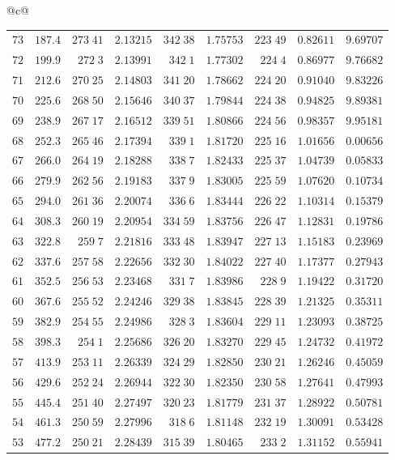 \begin{center}
{\begin{tabular}{@{}c@{}}
\begin{tabular}{r|r|r|r|r|r|r|r|r}
$73$&$187.4$&$273\;41$&$2.13215$&$342\;38$&$1.75753$&$223\;49$&$0.82611$&$9.69707$\\
$72$&$199.9$&$272\;3$&$2.13991$&$342\;1$&$1.77302$&$224\;4$&$0.86977$&$9.76682$\\
$71$&$212.6$&$270\;25$&$2.14803$&$341\;20$&$1.78662$&$224\;20$&$0.91040$&$9.83226$\\[2pt]
$70$&$225.6$&$268\;50$&$2.15646$&$340\;37$&$1.79844$&$224\;38$&$0.94825$&$9.89381$\\
$69$&$238.9$&$267\;17$&$2.16512$&$339\;51$&$1.80866$&$224\;56$&$0.98357$&$9.95181$\\
$68$&$252.3$&$265\;46$&$2.17394$&$339\;1$&$1.81720$&$225\;16$&$1.01656$&$0.00656$\\
$67$&$266.0$&$264\;19$&$2.18288$&$338\;7$&$1.82433$&$225\;37$&$1.04739$&$0.05833$\\
$66$&$279.9$&$262\;56$&$2.19183$&$337\;9$&$1.83005$&$225\;59$&$1.07620$&$0.10734$\\[2pt]
$65$&$294.0$&$261\;36$&$2.20074$&$336\;6$&$1.83444$&$226\;22$&$1.10314$&$0.15379$\\
$64$&$308.3$&$260\;19$&$2.20954$&$334\;59$&$1.83756$&$226\;47$&$1.12831$&$0.19786$\\
$63$&$322.8$&$259\;7$&$2.21816$&$333\;48$&$1.83947$&$227\;13$&$1.15183$&$0.23969$\\
$62$&$337.6$&$257\;58$&$2.22656$&$332\;30$&$1.84022$&$227\;40$&$1.17377$&$0.27943$\\
$61$&$352.5$&$256\;53$&$2.23468$&$331\;7$&$1.83986$&$228\;9$&$1.19422$&$0.31720$\\[2pt]
$60$&$367.6$&$255\;52$&$2.24246$&$329\;38$&$1.83845$&$228\;39$&$1.21325$&$0.35311$\\
$59$&$382.9$&$254\;55$&$2.24986$&$328\;3$&$1.83604$&$229\;11$&$1.23093$&$0.38725$\\
$58$&$398.3$&$254\;1$&$2.25686$&$326\;20$&$1.83270$&$229\;45$&$1.24732$&$0.41972$\\
$57$&$413.9$&$253\;11$&$2.26339$&$324\;29$&$1.82850$&$230\;21$&$1.26246$&$0.45059$\\
$56$&$429.6$&$252\;24$&$2.26944$&$322\;30$&$1.82350$&$230\;58$&$1.27641$&$0.47993$\\[2pt]
$55$&$445.4$&$251\;40$&$2.27497$&$320\;23$&$1.81779$&$231\;37$&$1.28922$&$0.50781$\\
$54$&$461.3$&$250\;59$&$2.27996$&$318\;6$&$1.81148$&$232\;19$&$1.30091$&$0.53428$\\
$53$&$477.2$&$250\;21$&$2.28439$&$315\;39$&$1.80465$&$233\;2$&$1.31152$&$0.55941$\\

\end{tabular}
\end{tabular}}
\end{center}
